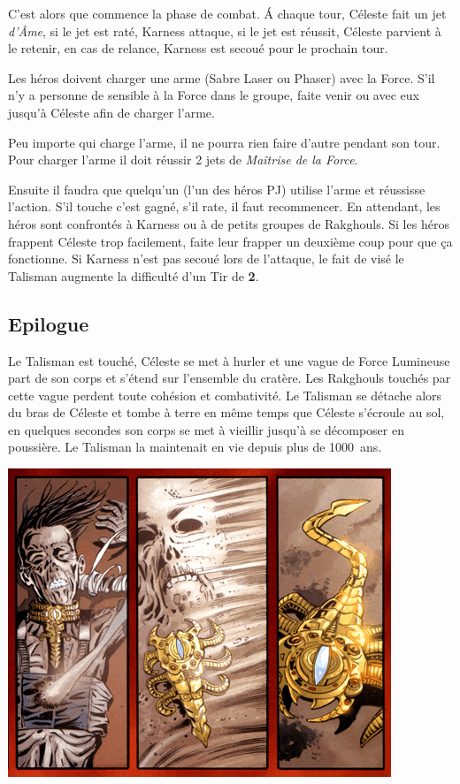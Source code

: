 C’est alors que commence la phase de combat. \'A chaque tour, Céleste fait un jet \textit{d’\^Ame}, si le jet est raté, Karness attaque, si le jet est réussit, Céleste parvient à le retenir, en cas de relance, Karness est secoué pour le prochain tour.

Les héros doivent charger une arme (Sabre Laser ou Phaser) avec la Force. S’il n’y a personne de sensible à la Force dans le groupe, faite venir  ou  avec eux jusqu’à Céleste afin de charger l’arme.

Peu importe qui charge l’arme, il ne pourra rien faire d’autre pendant son tour. Pour charger l’arme il doit réussir 2 jets de \textit{Maîtrise de la Force}.

Ensuite il faudra que quelqu’un (l’un des héros PJ) utilise l’arme et réussisse l’action. S’il touche c’est gagné, s’il rate, il faut recommencer. En attendant, les héros sont confrontés à Karness ou à de petits groupes de Rakghouls. Si les héros frappent Céleste trop facilement, faite leur frapper un deuxième coup pour que ça fonctionne. Si Karness n’est pas secoué lors de l’attaque, le fait de visé le Talisman augmente la difficulté d’un Tir de \textbf{2}.

\subsection{Epilogue}
Le Talisman est touché, Céleste se met à hurler et une vague de Force Lumineuse part de son corps et s’étend sur l’ensemble du cratère. Les Rakghouls touchés par cette vague perdent toute cohésion et combativité. Le Talisman se détache alors du bras de Céleste et tombe à terre en même temps que Céleste s’écroule au sol, en quelques secondes son corps se met à vieillir jusqu’à se décomposer en poussière. Le Talisman la maintenait en vie depuis plus de 1000~ans.

\noindent\includegraphics[width=\linewidth]{_img/pnjs/celeste-morne-death.png}

